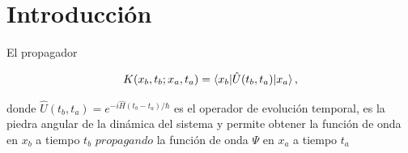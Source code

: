 \documentclass[11pt,a4paper,twoside,pdf]{article}
\numberwithin{equation}{section}
\begin{document}
\begin{abstract}
\normalsize

Se reproducen los resultados del trabajo de Creutz y Freedman \cite{creutz1981statistical}, donde se aplica el método de Monte Carlo a la integral de caminos en tiempo euclídeo para estudiar problemas de mecánica cuántica unidimensional. Tras una rotación de Wick, el peso oscilatorio $e^{iS/\hbar}$ de la formulación de Feynman se convierte en un peso real positivo $e^{-S_E/\hbar}$ formalmente idéntico a la distribución de Boltzmann de un sistema estadístico clásico, lo que permite muestrear configuraciones de caminos mediante el algoritmo $M(RT)^2$ o de Metropolis. Se analiza el oscilador armónico (validación del método), el oscilador anarmónico, el doble pozo y su contenido en instantones, así como la respuesta del sistema a una fuente externa y la construcción del potencial efectivo renormalizado. Las simulaciones se realizan sobre una red temporal de $N=200, 400$ puntos con condiciones de contorno periódicas, o antiperiódicas en el caso de $kinks$.

\end{abstract}


\vspace{1mm}


\newpage
\tableofcontents



\pagestyle{fancy}
\fancyhead[RO,LE]{\leftmark}
\fancyhead[LO,RE]{\thepage}
\fancyfoot{}


\newpage


\section{Introducción}

El propagador

\begin{equation}
    K(x_b, t_b; x_a, t_a) = \braket{x_b | \hat{U}(t_b, t_a) | x_a},
    \label{Kdef}
\end{equation}

donde $\hat{U}(t_b, t_a) = e^{-i\hat{H}(t_b - t_a)/\hbar}$ es el operador de evolución temporal, es la piedra angular de la dinámica del sistema y permite obtener la función de onda en $x_b$ a tiempo $t_b$ $propagando$ la función de onda $\Psi$ en $x_a$ a tiempo $t_a$
\end{document}
